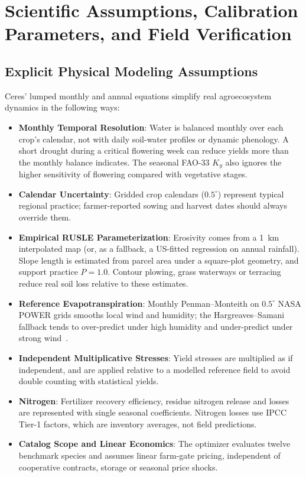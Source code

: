 \section{Scientific Assumptions, Calibration Parameters, and Field Verification}
\label{sec:limitations}

\subsection{Explicit Physical Modeling Assumptions}
Ceres' lumped monthly and annual equations simplify real agroecosystem dynamics in the following ways:
\begin{itemize}[leftmargin=1.5em]
  \item \textbf{Monthly Temporal Resolution}: Water is balanced monthly over each crop's calendar, not with daily soil-water profiles or dynamic phenology. A short drought during a critical flowering week can reduce yields more than the monthly balance indicates. The seasonal FAO-33 $K_y$ also ignores the higher sensitivity of flowering compared with vegetative stages.
  \item \textbf{Calendar Uncertainty}: Gridded crop calendars ($0.5^{\circ}$) represent typical regional practice; farmer-reported sowing and harvest dates should always override them.
  \item \textbf{Empirical RUSLE Parameterization}: Erosivity comes from a 1~km interpolated map (or, as a fallback, a US-fitted regression on annual rainfall). Slope length is estimated from parcel area under a square-plot geometry, and support practice $P = 1.0$. Contour plowing, grass waterways or terracing reduce real soil loss relative to these estimates.
  \item \textbf{Reference Evapotranspiration}: Monthly Penman--Monteith on $0.5^{\circ}$ NASA POWER grids smooths local wind and humidity; the Hargreaves--Samani fallback tends to over-predict under high humidity and under-predict under strong wind~\cite{allen1998fao56}.
  \item \textbf{Independent Multiplicative Stresses}: Yield stresses are multiplied as if independent, and are applied relative to a modelled reference field to avoid double counting with statistical yields.
  \item \textbf{Nitrogen}: Fertilizer recovery efficiency, residue nitrogen release and losses are represented with single seasonal coefficients. Nitrogen losses use IPCC Tier-1 factors, which are inventory averages, not field predictions.
  \item \textbf{Catalog Scope and Linear Economics}: The optimizer evaluates twelve benchmark species and assumes linear farm-gate pricing, independent of cooperative contracts, storage or seasonal price shocks.
\end{itemize}

